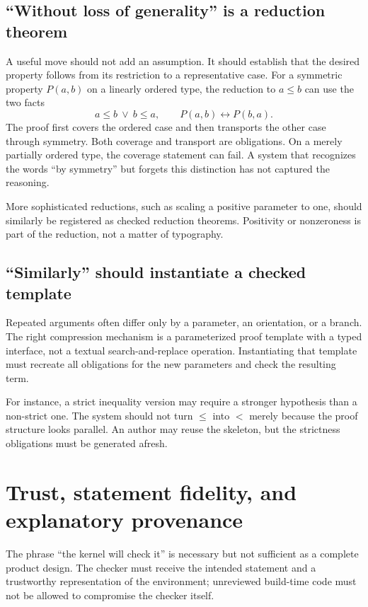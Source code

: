 \documentclass[11pt,a4paper]{article}
\newcommand{\code}[1]{\texttt{\detokenize{#1}}}
\theoremstyle{remark}
\begin{document}
\subsection{``Without loss of generality'' is a reduction theorem}
A useful \code{wlog} move should not add an assumption. It should establish that the desired property follows from its restriction to a representative case. For a symmetric property $P(a,b)$ on a linearly ordered type, the reduction to $a\leq b$ can use the two facts
\[
a\leq b\ \lor\ b\leq a,
\qquad P(a,b)\leftrightarrow P(b,a).
\]
The proof first covers the ordered case and then transports the other case through symmetry. Both coverage and transport are obligations. On a merely partially ordered type, the coverage statement can fail. A system that recognizes the words ``by symmetry'' but forgets this distinction has not captured the reasoning.

More sophisticated reductions, such as scaling a positive parameter to one, should similarly be registered as checked reduction theorems. Positivity or nonzeroness is part of the reduction, not a matter of typography.

\subsection{``Similarly'' should instantiate a checked template}
Repeated arguments often differ only by a parameter, an orientation, or a branch. The right compression mechanism is a parameterized proof template with a typed interface, not a textual search-and-replace operation. Instantiating that template must recreate all obligations for the new parameters and check the resulting term.

For instance, a strict inequality version may require a stronger hypothesis than a non-strict one. The system should not turn $\leq$ into $<$ merely because the proof structure looks parallel. An author may reuse the skeleton, but the strictness obligations must be generated afresh.

\section{Trust, statement fidelity, and explanatory provenance}
\label{sec:trust}
The phrase ``the kernel will check it'' is necessary but not sufficient as a complete product design. The checker must receive the intended statement and a trustworthy representation of the environment; unreviewed build-time code must not be allowed to compromise the checker itself.
\end{document}
